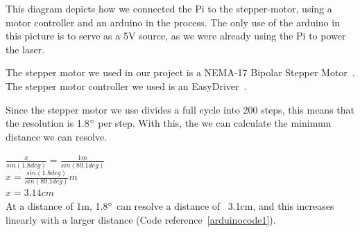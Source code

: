 This diagram depicts how we connected the Pi to the stepper-motor, using a motor controller and an arduino in the process.
The only use of the arduino in this picture is to serve as a 5V source, as we were already using the Pi to power the laser.

The stepper motor we used in our project is a NEMA-17 Bipolar Stepper Motor~\cite{steppermotor}.
The stepper motor controller we used is an EasyDriver~\cite{steppercontroller}.



Since the stepper motor we use divides a full cycle into 200 steps, this means that the resolution is 1.8$\degree$ per step. With this, the we can calculate the minimum distance we can resolve. %

$\frac{x}{sin(1.8deg)} = \frac{1m}{sin(89.1deg)}$ \\
$x = \frac{sin(1.8deg)}{sin(89.1deg)}m$ \\
$x = 3.14cm$ \\

At a distance of 1m, 1.8$\degree$ can resolve a distance of ~3.1cm, and this increases linearly with a larger distance (Code reference~\ref{arduinocode1}).
